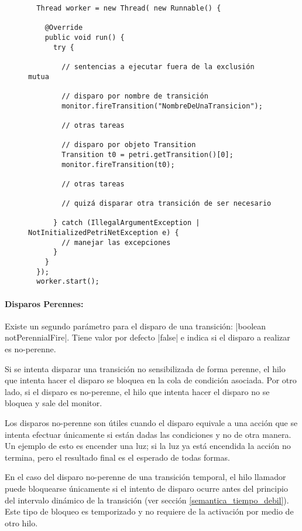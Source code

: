 \begin{figure}[H]
\centering
\begin{verbatim}
  Thread worker = new Thread( new Runnable() {
  
    @Override
    public void run() {
      try {
      
        // sentencias a ejecutar fuera de la exclusión mutua

        // disparo por nombre de transición
        monitor.fireTransition("NombreDeUnaTransicion");

        // otras tareas

        // disparo por objeto Transition
        Transition t0 = petri.getTransition()[0];
        monitor.fireTransition(t0);
      
        // otras tareas
      
        // quizá disparar otra transición de ser necesario

      } catch (IllegalArgumentException | NotInitializedPetriNetException e) {
        // manejar las excepciones
      }
    }
  });
  worker.start();
\end{verbatim}
\end{figure}

\paragraph{Disparos Perennes:}
Existe un segundo parámetro para el disparo de una transición: 
|boolean notPerennialFire|. Tiene valor por defecto
|false| e indica si el disparo a realizar es no-perenne.

Si se intenta disparar una transición no sensibilizada de forma perenne, el hilo
que intenta hacer el disparo se bloquea en la cola de condición asociada. Por
otro lado, si el disparo es no-perenne, el hilo que intenta hacer el disparo no
se bloquea y sale del monitor.

Los disparos no-perenne son útiles cuando el disparo equivale a una acción que
se intenta efectuar únicamente si están dadas las condiciones y no de otra
manera. Un ejemplo de esto es encender una luz; si la luz ya está encendida la
acción no termina, pero el resultado final es el esperado de todas formas.

En el caso del disparo no-perenne de una transición temporal, el hilo
llamador puede bloquearse únicamente si el intento de disparo ocurre antes del
principio del intervalo dinámico de la transición (ver sección
\ref{semantica_tiempo_debil}). Este tipo de bloqueo es temporizado y no requiere
de la activación por medio de otro hilo.

